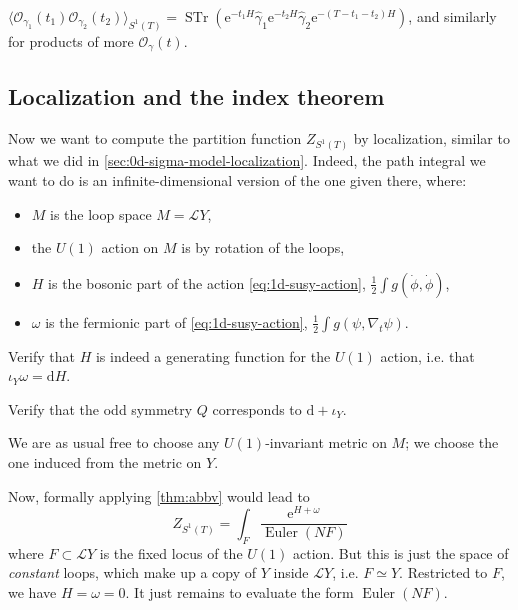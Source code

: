 \documentclass[12pt,letterpaper,reqno]{article}
\numberwithin{equation}{section}
\newcommand{\cL}{\ensuremath{\mathcal L}}
\newcommand{\cO}{\ensuremath{\mathcal O}}
\newcommand{\half}{\ensuremath{\frac{1}{2}}}
\newcommand{\e}{{\mathrm e}}
\newcommand{\de}{\mathrm{d}}
\newcommand{\IP}[1]{\langle#1\rangle}
\newcommand{\ti}[1]{\textit{#1}}
\DeclareMathOperator{\STr}{STr}
\DeclareMathOperator{\Euler}{Euler}
\newcommand{\fixme}[1]{{\color{orange}{[#1]}}}
\begin{document}
\begin{prop} 
$\IP{\cO_{\gamma_1}(t_1) \cO_{\gamma_2}(t_2)}_{S^1(T)} = \STr (\e^{-t_1 H} \hat\gamma_1 \e^{-t_2 H} \hat\gamma_2 \e^{-(T-t_1-t_2)H})$,
and similarly for products of more $\cO_\gamma(t)$.
\end{prop}

\fixme{give some sketch proof? discretization?}

\fixme{supercurrent which maps to the Dirac operator}


\subsection{Localization and the index theorem}

Now we want to compute the partition function $Z_{S^1(T)}$ by localization,
similar to what we did in \autoref{sec:0d-sigma-model-localization}.
Indeed, the path integral we want to do is an infinite-dimensional
version of the one given there, where:
\begin{itemize} 
\item $M$ is the loop space $M = \cL Y$,
\item the $U(1)$ action on $M$ is by rotation of the loops,
\item $H$ is the bosonic part of the action \eqref{eq:1d-susy-action}, $\half \int g(\dot\phi,\dot\phi)$,
\item $\omega$ is the fermionic part of \eqref{eq:1d-susy-action}, $\half \int g(\psi, \nabla_t \psi)$.
\end{itemize}

\begin{exercise} Verify that $H$ is indeed a generating function for the $U(1)$ action, i.e.
that $\iota_Y \omega = \de H$. \fixme{watch out for factor of 2 here}
\end{exercise}

\begin{exercise} Verify that the odd symmetry $Q$ corresponds to $\de + \iota_Y$.
\end{exercise}
\fixme{notation problem: used $Y$ for the vector field earlier, now using it for target}

We are as usual free to choose any $U(1)$-invariant metric on $M$; we choose the
one induced from the metric on $Y$.

Now, formally applying \autoref{thm:abbv} would lead to
\begin{equation} \label{eq:zs1-abbv-formal}
  Z_{S^1(T)} = \int_F \frac{\e^{H + \omega}}{\Euler(NF)}
\end{equation}
where $F \subset \cL Y$ is the fixed locus of the $U(1)$ action.
But this is just the space of \ti{constant} loops,
which make up a copy of $Y$ inside $\cL Y$, i.e. $F \simeq Y$.
Restricted to $F$, we have $H = \omega = 0$. It just 
remains to evaluate the form $\Euler(NF)$. 
\end{document}
